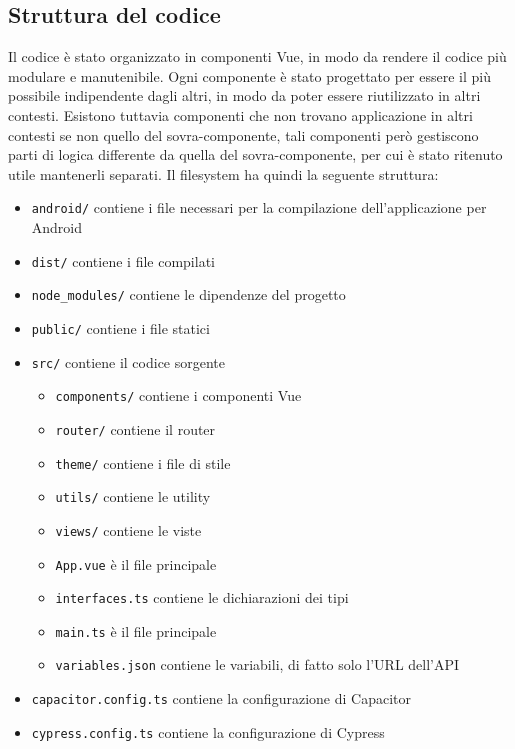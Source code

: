 \documentclass{article}
\begin{document}
\subsection{Struttura del codice}
Il codice è stato organizzato in componenti Vue, in modo da rendere il codice più modulare e manutenibile. Ogni componente è stato progettato per essere il più possibile indipendente dagli altri, in modo da poter essere riutilizzato in altri contesti. Esistono tuttavia componenti che non trovano applicazione in altri contesti se non quello del sovra-componente, tali componenti però gestiscono parti di logica differente da quella del sovra-componente, per cui è stato ritenuto utile mantenerli separati.
Il filesystem ha quindi la seguente struttura:
\begin{itemize}
    \item \texttt{android/} contiene i file necessari per la compilazione dell'applicazione per Android
    \item \texttt{dist/} contiene i file compilati
    \item \texttt{node\_modules/} contiene le dipendenze del progetto
    \item \texttt{public/} contiene i file statici
    \item \texttt{src/} contiene il codice sorgente
        \begin{itemize}
            \item \texttt{components/} contiene i componenti Vue
            \item \texttt{router/} contiene il router
            \item \texttt{theme/} contiene i file di stile
            \item \texttt{utils/} contiene le utility
            \item \texttt{views/} contiene le viste
            \item \texttt{App.vue} è il file principale
            \item \texttt{interfaces.ts} contiene le dichiarazioni dei tipi
            \item \texttt{main.ts} è il file principale
            \item \texttt{variables.json} contiene le variabili, di fatto solo l'URL dell'API
        \end{itemize}
    \item \texttt{capacitor.config.ts} contiene la configurazione di Capacitor
    \item \texttt{cypress.config.ts} contiene la configurazione di Cypress

\end{itemize}
\end{document}
